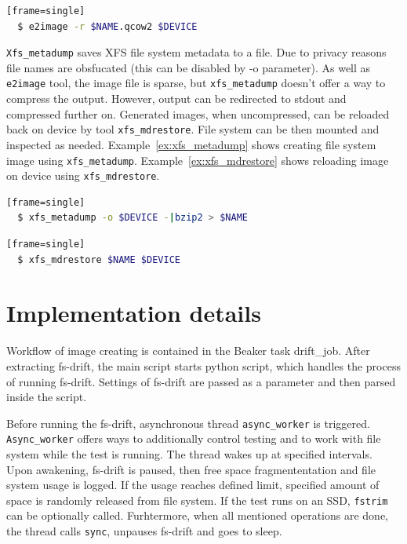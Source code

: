 \documentclass[
  color, %
  table, %
  lof,   %
  lot,   %
]{fithesis3}
\begin{document}
\begin{lstlisting}[language=bash, label={ex:e2image2}, caption={Reloading compressed image}][frame=single]
  $ e2image -r $NAME.qcow2 $DEVICE
\end{lstlisting}

\texttt{Xfs\_metadump} saves XFS file system metadata to a file. Due to privacy reasons file names are obsfucated (this can be disabled by -o parameter). As well as \texttt{e2image} tool, the image file is sparse, but \texttt{xfs\_metadump} doesn't offer a way to compress the output. However, output can be redirected to stdout and compressed further on. Generated images, when uncompressed, can be reloaded back on device by tool \texttt{xfs\_mdrestore}. File system can be then mounted and inspected as needed. Example~\ref{ex:xfs_metadump} shows creating file system image using \texttt{xfs\_metadump}. Example~\ref{ex:xfs_mdrestore} shows reloading image on device using \texttt{xfs\_mdrestore}.

\begin{lstlisting}[language=bash, label={ex:xfs_metadump}, caption={Creating compressed image using \texttt{xfs\_metadump}}][frame=single]
  $ xfs_metadump -o $DEVICE -|bzip2 > $NAME
\end{lstlisting}

\begin{lstlisting}[language=bash, label={ex:xfs_mdrestore},caption={Reloading image using \texttt{xfs\_mdrestore}}][frame=single]
  $ xfs_mdrestore $NAME $DEVICE
\end{lstlisting}

\section{Implementation details}
Workflow of image creating is contained in the Beaker task drift\_job. After extracting fs-drift, the main script starts python script, which handles the process of running fs-drift. Settings of fs-drift are passed as a parameter and then parsed inside the script.

Before running the fs-drift, asynchronous thread \texttt{async\_worker} is triggered. \texttt{Async\_worker} offers ways to additionally control testing and to work with file system while the test is running. The thread wakes up at specified intervals. Upon awakening, fs-drift is paused, then free space fragmententation and file system usage is logged. If the usage reaches defined limit, specified amount of space is randomly released from file system. If the test runs on an SSD, \texttt{fstrim} can be optionally called. Furhtermore, when all mentioned operations are done, the thread calls \texttt{sync}, unpauses fs-drift and goes to sleep.
\end{document}
